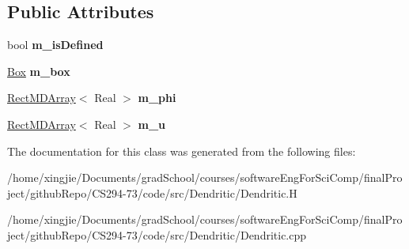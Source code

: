 \subsection*{Public Attributes}
\begin{DoxyCompactItemize}
\item 
\hypertarget{classDendritic_a4cde2313fd108d64c94eb58829c1b8d4}{}bool {\bfseries m\+\_\+is\+Defined}\label{classDendritic_a4cde2313fd108d64c94eb58829c1b8d4}

\item 
\hypertarget{classDendritic_a027e1104026bbde26dc050c67dbc6808}{}\hyperlink{classBox}{Box} {\bfseries m\+\_\+box}\label{classDendritic_a027e1104026bbde26dc050c67dbc6808}

\item 
\hypertarget{classDendritic_a5d2ebb6ba207172b5c00fd3d43173fbd}{}\hyperlink{classRectMDArray}{Rect\+M\+D\+Array}$<$ Real $>$ {\bfseries m\+\_\+phi}\label{classDendritic_a5d2ebb6ba207172b5c00fd3d43173fbd}

\item 
\hypertarget{classDendritic_a2bdf3ee8b87990e6d67bd341905235f3}{}\hyperlink{classRectMDArray}{Rect\+M\+D\+Array}$<$ Real $>$ {\bfseries m\+\_\+u}\label{classDendritic_a2bdf3ee8b87990e6d67bd341905235f3}

\end{DoxyCompactItemize}


The documentation for this class was generated from the following files\+:\begin{DoxyCompactItemize}
\item 
/home/xingjie/\+Documents/grad\+School/courses/software\+Eng\+For\+Sci\+Comp/final\+Project/github\+Repo/\+C\+S294-\/73/code/src/\+Dendritic/Dendritic.\+H\item 
/home/xingjie/\+Documents/grad\+School/courses/software\+Eng\+For\+Sci\+Comp/final\+Project/github\+Repo/\+C\+S294-\/73/code/src/\+Dendritic/Dendritic.\+cpp\end{DoxyCompactItemize}
